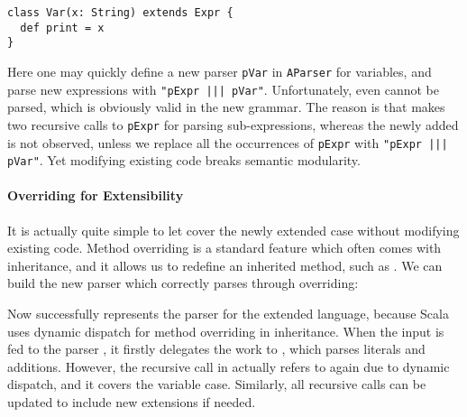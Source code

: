 \vspace{-5pt}
\begin{lstlisting}
class Var(x: String) extends Expr {
  def print = x
}
\end{lstlisting}
\vspace{-5pt}

Here one may quickly define a new parser \lstinline|pVar| in \lstinline|AParser| for variables, and parse new expressions
with \lstinline{"pExpr ||| pVar"}.
Unfortunately, even  cannot be parsed, which is obviously valid in the new grammar.
The reason is that  makes two recursive calls to \lstinline|pExpr| for parsing sub-expressions, whereas the newly added  is not observed, unless we replace all the occurrences of \lstinline|pExpr| with \lstinline{"pExpr ||| pVar"}.
Yet modifying existing code breaks semantic modularity.

\vspace{-.05in}
\paragraph{Overriding for Extensibility}
It is actually quite simple to let  cover the newly
extended case without modifying existing code. Method overriding is a
standard feature which often comes with inheritance, and it allows us
to redefine an inherited method, such as . We can
build the new parser which correctly parses 
through overriding:

\vspace{-4pt}
\vspace{-4pt}

Now  successfully represents the parser for the extended language, because Scala uses dynamic dispatch for
method overriding in inheritance. When the input  is fed to the parser , it firstly delegates
the work to , which parses literals and additions. However, the recursive call  in 
actually refers to  again due to dynamic dispatch, and it covers the variable case. Similarly, all recursive calls can be updated to include new extensions if needed.

\vspace{-.05in}
